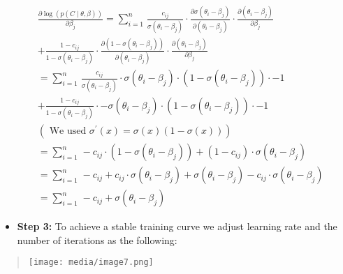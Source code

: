 \[\begin{aligned}
 & \frac{\partial\log(p(C \mid \theta,\beta))}{\partial\beta_{j}} = \sum_{i = 1}^{n}\mspace{2mu}\frac{c_{ij}}{\sigma\left( \theta_{i} - \beta_{j} \right)} \cdot \frac{\partial\sigma\left( \theta_{i} - \beta_{j} \right)}{\partial\left( \theta_{i} - \beta_{j} \right)} \cdot \frac{\partial\left( \theta_{i} - \beta_{j} \right)}{\partial\beta_{j}} \\
 & + \frac{1 - c_{ij}}{1 - \sigma\left( \theta_{i} - \beta_{j} \right)} \cdot \frac{\partial\left( 1 - \sigma\left( \theta_{i} - \beta_{j} \right) \right)}{\partial\left( \theta_{i} - \beta_{j} \right)} \cdot \frac{\partial\left( \theta_{i} - \beta_{j} \right)}{\partial\beta_{j}} \\
 & = \sum_{i = 1}^{n}\mspace{2mu}\frac{c_{ij}}{\sigma\left( \theta_{i} - \beta_{j} \right)} \cdot \sigma\left( \theta_{i} - \beta_{j} \right) \cdot \left( 1 - \sigma\left( \theta_{i} - \beta_{j} \right) \right) \cdot - 1 \\
 & + \frac{1 - c_{ij}}{1 - \sigma\left( \theta_{i} - \beta_{j} \right)} \cdot - \sigma\left( \theta_{i} - \beta_{j} \right) \cdot \left( 1 - \sigma\left( \theta_{i} - \beta_{j} \right) \right) \cdot - 1 \\
 & \left( \text{ We used }\sigma^{'}(x) = \sigma(x)(1 - \sigma(x)) \right) \\
 & = \sum_{i = 1}^{n}\mspace{2mu} - c_{ij} \cdot \left( 1 - \sigma\left( \theta_{i} - \beta_{j} \right) \right) + \left( 1 - c_{ij} \right) \cdot \sigma\left( \theta_{i} - \beta_{j} \right) \\
 & = \sum_{i = 1}^{n}\mspace{2mu} - c_{ij} + c_{ij} \cdot \sigma\left( \theta_{i} - \beta_{j} \right) + \sigma\left( \theta_{i} - \beta_{j} \right) - c_{ij} \cdot \sigma\left( \theta_{i} - \beta_{j} \right) \\
 & = \sum_{i = 1}^{n}\mspace{2mu} - c_{ij} + \sigma\left( \theta_{i} - \beta_{j} \right)
\end{aligned}\]

\begin{itemize}
\item
  \textbf{Step 3:} To achieve a stable training curve we adjust learning
  rate and the number of iterations as the following:
\end{itemize}

\begin{quote}
\texttt{[image: media/image7.png]}
\end{quote}

